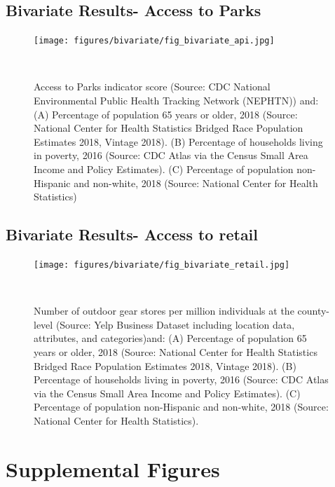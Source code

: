 \documentclass{article}
\begin{document}
\subsection{\textbf{Bivariate Results- Access to Parks}}
\begin{figure}[!h] 
    \centering
    \texttt{[image: figures/bivariate/fig\_bivariate\_api.jpg]}
    \caption{Access to Parks indicator score (Source: CDC National Environmental Public Health Tracking Network (NEPHTN)) and: (A) Percentage of population 65 years or older, 2018 (Source: National Center for Health Statistics Bridged Race Population Estimates 2018, Vintage 2018). (B) Percentage of households living in poverty, 2016 (Source: CDC Atlas via the Census Small Area Income and Policy Estimates). (C) Percentage of population non-Hispanic and non-white, 2018 (Source: National Center for Health Statistics)}
    \
\end{figure}
\FloatBarrier

\subsection{\textbf{Bivariate Results- Access to retail}}
\begin{figure}[!h] 
    \centering
    \texttt{[image: figures/bivariate/fig\_bivariate\_retail.jpg]}
    \caption{Number of outdoor gear stores per million individuals at the county-level (Source: Yelp Business Dataset including location data, attributes, and categories)and: (A) Percentage of population 65 years or older, 2018 (Source: National Center for Health Statistics Bridged Race Population Estimates 2018, Vintage 2018). (B) Percentage of households living in poverty, 2016 (Source: CDC Atlas via the Census Small Area Income and Policy Estimates). (C) Percentage of population non-Hispanic and non-white, 2018 (Source: National Center for Health Statistics).}
    \
\end{figure}
\FloatBarrier

\section{Supplemental Figures}
\end{document}
